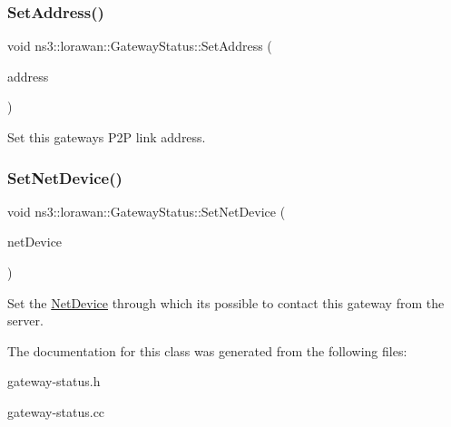 \subsubsection{\texorpdfstring{Set\+Address()}{SetAddress()}}
{\footnotesize\ttfamily void ns3\+::lorawan\+::\+Gateway\+Status\+::\+Set\+Address (\begin{DoxyParamCaption}\item[{Address}]{address }\end{DoxyParamCaption})}

Set this gateway\textquotesingle{}s P2P link address. \mbox{\label{classns3_1_1lorawan_1_1GatewayStatus_af491570545959a7b8f1d0bb7228d520d}} 
\subsubsection{\texorpdfstring{Set\+Net\+Device()}{SetNetDevice()}}
{\footnotesize\ttfamily void ns3\+::lorawan\+::\+Gateway\+Status\+::\+Set\+Net\+Device (\begin{DoxyParamCaption}\item[{Ptr$<$ \hyperlink{classNetDevice}{Net\+Device} $>$}]{net\+Device }\end{DoxyParamCaption})}

Set the \hyperlink{classNetDevice}{Net\+Device} through which it\textquotesingle{}s possible to contact this gateway from the server. 

The documentation for this class was generated from the following files\+:\begin{DoxyCompactItemize}
\item 
gateway-\/status.\+h\item 
gateway-\/status.\+cc\end{DoxyCompactItemize}

